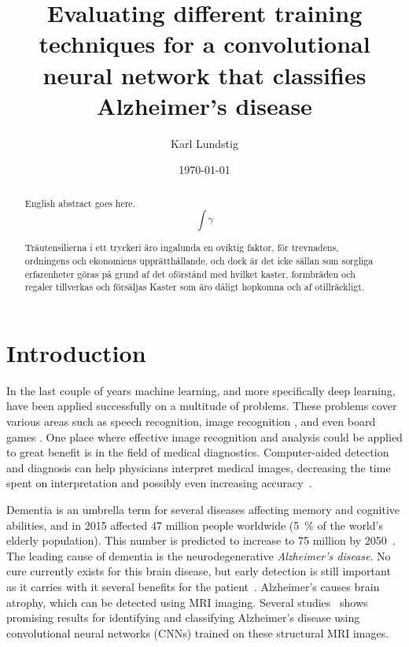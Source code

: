 \documentclass{kththesis}
\title{Evaluating different training techniques for a convolutional neural network that classifies Alzheimer's disease}
\author{Karl Lundstig}
\date{\today}
\begin{document}
\frontmatter

\titlepage

\begin{abstract}
  English abstract goes here.
  $$\int \gamma$$

\end{abstract}


\begin{otherlanguage}{swedish}
  \begin{abstract}
    Träutensilierna i ett tryckeri äro ingalunda en oviktig faktor,
    för trevnadens, ordningens och ekonomiens upprätthållande, och
    dock är det icke sällan som sorgliga erfarenheter göras på grund
    af det oförstånd med hvilket kaster, formbräden och regaler
    tillverkas och försäljas Kaster som äro dåligt hopkomna och af
    otillräckligt.
  \end{abstract}
\end{otherlanguage}


\setcounter{secnumdepth}{2}
\setcounter{tocdepth}{2}
\tableofcontents


\mainmatter

\chapter{Introduction}
In the last couple of years machine learning, and more specifically deep learning, have been applied successfully on a multitude of problems. These problems cover various areas such as speech recognition, image recognition \parencite{krizhevsky2012imagenet}, and even board games \parencite{silver2018general}. One place where effective image recognition and analysis could be applied to great benefit is in the field of medical diagnostics. Computer-aided detection and diagnosis can help physicians interpret medical images, decreasing the time spent on interpretation and possibly even increasing accuracy~\cite{erickson2017machine}.

Dementia is an umbrella term for several diseases affecting memory and cognitive abilities, and in 2015 affected 47 million people worldwide (5~\% of the world’s elderly population). This number is predicted to increase to 75 million by 2050~\cite{dementiaWHO}. The leading cause of dementia is the neurodegenerative \textit{Alzheimer’s disease}. No cure currently exists for this brain disease, but early detection is still important as it carries with it several benefits for the patient~\cite{factsfigures2018}. Alzheimer's causes brain atrophy, which can be detected using MRI imaging. Several studies~\cite{islam2017novel, islam2018early} shows promising results for identifying and classifying Alzheimer’s disease using convolutional neural networks (CNNs) trained on these structural MRI images.
\end{document}
